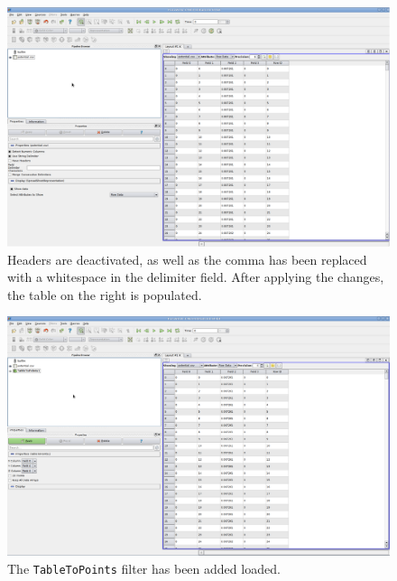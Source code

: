 \begin{figure}[!ht]
\includegraphics[width=0.9\columnwidth]{figures/para2.eps}
\caption{Headers are deactivated, as well as the comma has been replaced with a whitespace in the delimiter field.
After applying the changes, the table on the right is populated.}
\label{fig:para2}
\end{figure}

\begin{figure}[!ht]
\includegraphics[width=0.9\columnwidth]{figures/para3.eps}
\caption{The \texttt{TableToPoints} filter has been added loaded.}
\label{fig:para3}
\end{figure}

